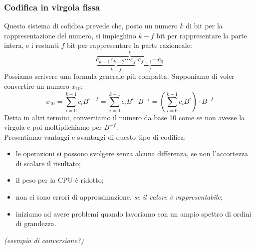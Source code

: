 \subsubsection{Codifica in virgola fissa} Questo sistema di cofidica prevede che, posto un numero $k$ di bit per la rappresentazione del numero, si impieghino $k-f$ bit per rappresentare la parte intera, e i restanti $f$ bit per rappresentare la parte razioneale:
\begin{equation*}
\overbrace{\underbrace{c_{k-1}c_{k-2}\cdots c_{f}}_\text{$k-f$}\underbrace{\cdot c_{f-1}\cdots c_{0}}_\text{$f$}}^\text{$k$}
\end{equation*}
 Possiamo scrivere una formula generale più compatta. Supponiamo di voler convertire un numero $x_{10}$:
 \begin{equation*}
 x_{10}=\sum_{i=0}^{k-1} c_{i}B^{i-f}=\sum_{i=0}^{k-1} c_{i}B^{i}\cdot B^{-f}=(\sum_{i=0}^{k-1} c_{i}B^{i})\cdot B^{-f}
 \end{equation*}
 Detta in altri termini, convertiamo il numero da base 10 come se non avesse la virgola e poi moltiplichiamo per $B^{-f}$.\\
 Presentiamo vantaggi e svantaggi di questo tipo di codifica:
  \begin{itemize}[noitemsep,nolistsep]
  	\item le operazioni si possono svolgere senza alcuna differenza, se non l'accortezza di scalare il risultato;
  	\item il peso per la CPU è ridotto;
  	\item non ci sono errori di approssimazione, \textit{se il valore è rappresentabile};
  	\item iniziamo ad avere problemi quando lavoriamo con un ampio spettro di ordini di grandezza.
  \end{itemize}
 
\textit{(esempio di conversione?)}
